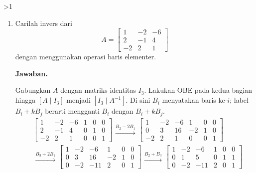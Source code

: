 \documentclass[12pt]{article}
\newcommand{\answername}{Jawaban}
\newenvironment{soaljawab}[1]{%
    \ifnum#1>1\clearpage\fi
    \begin{tcolorbox}[enhanced,breakable,height fill,height fixed for=all,
        sharp corners,colback=white,colframe=black,boxrule=0.4bp,
        boxsep=0pt,left=12bp,right=12bp,top=6bp,bottom=10bp,
        before skip=0pt,after skip=0pt,pad at break=8bp]
    \fontsize{12bp}{14bp}\selectfont
    \setlength{\abovedisplayskip}{8bp}
    \setlength{\belowdisplayskip}{8bp}
    \setlength{\abovedisplayshortskip}{8bp}
    \setlength{\belowdisplayshortskip}{8bp}
    \renewcommand{\arraystretch}{1.15}
    \begin{enumerate}[start=#1,topsep=0pt]
}{%
    \end{enumerate}
    \end{tcolorbox}
}
\newcommand{\jawaban}{\par\medskip\textbf{\answername.}\par\smallskip}
\begin{document}
\begin{soaljawab}{5}
\item Carilah invers dari
        \[
          A = \begin{bmatrix}
            1  & -2 & -6 \\
            2  & -1 & 4  \\
            -2 & 2  & 1
          \end{bmatrix}
        \]
        dengan menggunakan operasi baris elementer.
\jawaban
Gabungkan $A$ dengan matriks identitas $I_3$. Lakukan OBE pada
kedua bagian hingga $[A\mid I_3]$ menjadi $[I_3\mid A^{-1}]$.
Di sini $B_i$ menyatakan baris ke-$i$; label $B_i+kB_j$ berarti
mengganti $B_i$ dengan $B_i+kB_j$.
{\setlength{\arraycolsep}{4bp}
\begin{align*}
    & \left[\begin{array}{ccc|ccc}
            1 & -2 & -6 & 1 & 0 & 0 \\
            2 & -1 & 4 & 0 & 1 & 0 \\
            -2 & 2 & 1 & 0 & 0 & 1
        \end{array}\right]
        \begin{array}{c}\xrightarrow{B_2-2B_1}\end{array}
        \left[\begin{array}{ccc|ccc}
            1 & -2 & -6 & 1 & 0 & 0 \\
            0 & 3 & 16 & -2 & 1 & 0 \\
            -2 & 2 & 1 & 0 & 0 & 1
        \end{array}\right] \\[6bp]
    & \begin{array}{c}\xrightarrow{B_3+2B_1}\end{array}
        \left[\begin{array}{ccc|ccc}
            1 & -2 & -6 & 1 & 0 & 0 \\
            0 & 3 & 16 & -2 & 1 & 0 \\
            0 & -2 & -11 & 2 & 0 & 1
        \end{array}\right]
        \begin{array}{c}\xrightarrow{B_2+B_3}\end{array}
        \left[\begin{array}{ccc|ccc}
            1 & -2 & -6 & 1 & 0 & 0 \\
            0 & 1 & 5 & 0 & 1 & 1 \\
            0 & -2 & -11 & 2 & 0 & 1
        \end{array}\right] \\[6bp]

\end{align*}}
\end{soaljawab}
\end{document}
